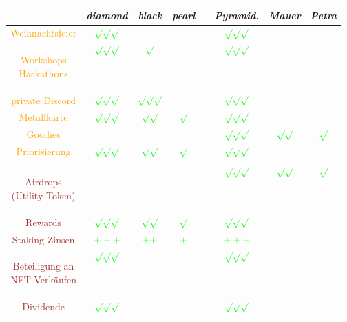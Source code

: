 \begin{tabular}[c]{|c|c|c|c|c|c|c|c|}
\hline
 & \textbf{\textit{diamond}} & \textbf{\textit{black}} & \textbf{\textit{pearl}} & & \textbf{\textit{Pyramid.}} & \textbf{\textit{Mauer}} & \textbf{\textit{Petra}} \\
\hline
\textcolor{orange}{Weihnachtsfeier} & $\color{green} \surd\surd\surd$ &  &  &  & $\color{green} \surd\surd\surd$ &  & \\
\hline
\textcolor{orange}{\parbox{2cm}{Workshops \\ Hackathons}} & $\color{green} \surd\surd\surd$ & $\color{green} \surd$ &  &  & $\color{green} \surd\surd\surd$ &  & \\
\hline
\textcolor{orange}{private Discord} & $\color{green} \surd\surd\surd$ & $\color{green} \surd\surd\surd$ &  &  & $\color{green} \surd\surd\surd$ &  & \\
\hline
\textcolor{orange}{Metallkarte} & $\color{green} \surd\surd\surd$ & $\color{green} \surd\surd$ &   $\color{green} \surd$ &  & $\color{green} \surd\surd\surd$ &  & \\
\hline
\textcolor{orange}{Goodies} &  &  &  &  & $\color{green} \surd\surd\surd$ & $\color{green} \surd\surd$ & $\color{green} \surd$ \\
\hline
\textcolor{orange}{Priorisierung} & $\color{green} \surd\surd\surd$ & $\color{green} \surd\surd$ &   $\color{green} \surd$ &  & $\color{green} \surd\surd\surd$ &  & \\
\hline
 &  &  &  &  &  &  & \\
\hline
\textcolor{brown}{\parbox{2.8cm}{Airdrops \\ (Utility Token)}} &  &  &  &  & $\color{green} \surd\surd\surd$ & $\color{green} \surd\surd$ & $\color{green} \surd$ \\
\hline
\textcolor{brown}{Rewards} & $\color{green} \surd\surd\surd$ & $\color{green} \surd\surd$ &   $\color{green} \surd$ &  & $\color{green} \surd\surd\surd$ &  & \\
\hline
\textcolor{brown}{Staking-Zinsen} & $\color{green} +++$ & $\color{green} ++$ &   $\color{green} +$ &  & $\color{green} +++$ &  & \\
\hline
\textcolor{brown}{\parbox{2.8cm}{Beteiligung an \\ NFT-Verkäufen}} & $\color{green} \surd\surd\surd$ &  &  &  & $\color{green} \surd\surd\surd$ &  & \\
\hline
\textcolor{brown}{Dividende} & $\color{green} \surd\surd\surd$ &  &  &  & $\color{green} \surd\surd\surd$ &  & \\

\end{tabular}
